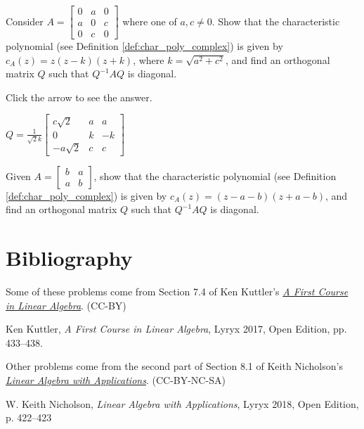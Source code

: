 \documentclass{ximera}
\begin{document}
\begin{problem}\label{prob:ortho11}
Consider $A = \begin{bmatrix}
0 & a & 0 \\
a & 0 & c \\
0 & c & 0
\end{bmatrix}$
 where one of $a, c \neq 0$. Show that the characteristic polynomial (see Definition \ref{def:char_poly_complex}) is given by $c_{A}(z) = z(z - k)(z + k)$, where $k = \sqrt{a^2 + c^2}$, and find an orthogonal matrix $Q$ such that $Q^{-1}AQ$ is diagonal.

Click the arrow to see the answer.
\begin{expandable}
$Q = \frac{1}{\sqrt{2}k}\begin{bmatrix}
c\sqrt{2} & a & a \\
0 & k & -k \\
-a\sqrt{2} & c & c
\end{bmatrix}$
\end{expandable}
\end{problem}

\begin{problem}\label{prob:ortho13}
Given $A = \begin{bmatrix}
b & a \\
a & b
\end{bmatrix}$, show that the characteristic polynomial (see Definition \ref{def:char_poly_complex}) is given by $c_{A}(z) = (z - a - b)(z + a - b)$, and find an orthogonal matrix $Q$ such that $Q^{-1}AQ$ is diagonal.
\end{problem}


\section*{Bibliography}

Some of these problems come from Section 7.4 of Ken Kuttler's \href{https://open.umn.edu/opentextbooks/textbooks/a-first-course-in-linear-algebra-2017}{\it A First Course in Linear Algebra}. (CC-BY)

Ken Kuttler, {\it  A First Course in Linear Algebra}, Lyryx 2017, Open Edition, pp. 433--438.  

Other problems come from the second part of Section 8.1 of Keith Nicholson's \href{https://open.umn.edu/opentextbooks/textbooks/linear-algebra-with-applications}{\it Linear Algebra with Applications}. (CC-BY-NC-SA)

W. Keith Nicholson, {\it Linear Algebra with Applications}, Lyryx 2018, Open Edition, p. 422--423 
\end{document}
